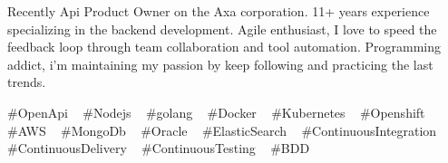 

\begin{cvparagraph}

Recently Api Product Owner on the Axa corporation. 11+ years experience specializing in the backend development. Agile enthusiast, I love to speed the feedback loop through team collaboration and tool automation. Programming addict, i'm maintaining my passion by keep following and practicing the last trends.
\end{cvparagraph}
\begin{cvtechnologies}
 \#OpenApi ~
 \#Nodejs ~
 \#golang ~
 \#Docker ~
 \#Kubernetes ~
 \#Openshift ~
 \#AWS ~
 \#MongoDb ~
 \#Oracle ~
 \#ElasticSearch ~
 \#ContinuousIntegration ~
 \#ContinuousDelivery ~
 \#ContinuousTesting ~
 \#BDD 
\end{cvtechnologies}
